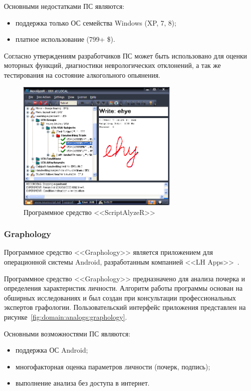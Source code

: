Основными недостатками ПС являются:
\begin{itemize}
  \item поддержка только ОС семейства Windows (XP, 7, 8);
  \item платное использование (799+ \$).
\end{itemize}

Согласно утверждениям разработчиков ПС может быть использовано для оценки моторных функций, диагностики неврологических отклонений, а так же тестирования на состояние алкогольного опьянения.

\begin{figure}[ht]
    \centering
    \includegraphics[width=0.7\textwidth]{figures/neuroscript.png}
    \caption{Программное средство <<ScriptAlyzeR>>}
    \label{fig:domain:analogs:neuro_script}
\end{figure}

\subsubsection{Graphology}
\label{sub:domain:analogs:graphology} 

Программное средство <<Graphology>> является приложением для операционной системы Android, разработанным компанией <<LH Apps>>~\cite{analogs_graphology}.

Программное средство <<Graphology>> предназначено для анализа почерка и определения характеристик личности. Алгоритм работы программы основан на обширных исследованиях и был создан при консультации профессиональных экспертов графологии. Пользовательский интерфейс приложения представлен на рисунке~\ref{fig:domain:analogs:graphology}.

Основными возможностями ПС являются:
\begin{itemize}
  \item поддержка ОС Android;
  \item многофакторная оценка параметров личности (почерк, подпись);
  \item выполнение анализа без доступа в интернет.
\end{itemize}


